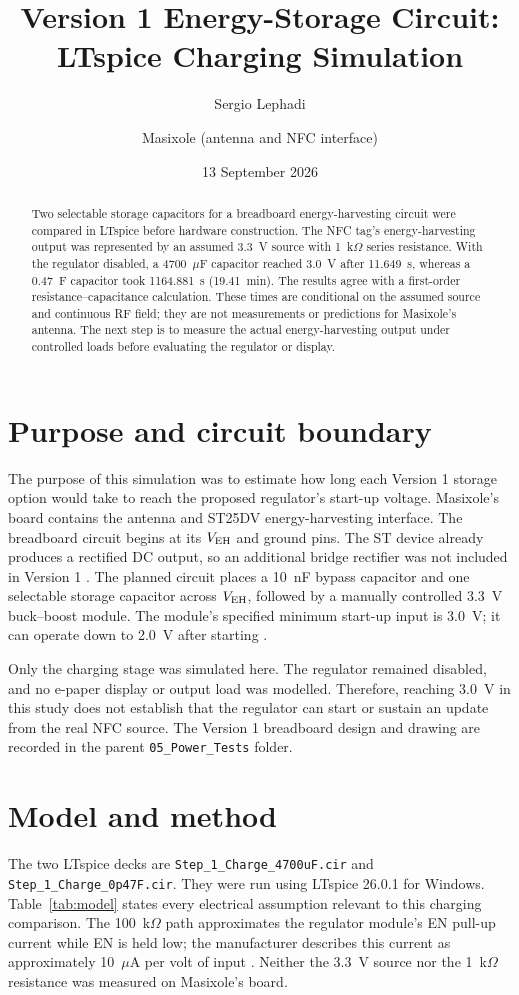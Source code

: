 \documentclass[11pt,a4paper]{article}
\title{Version 1 Energy-Storage Circuit: LTspice Charging Simulation}
\author{Sergio Lephadi \and Masixole (antenna and NFC interface)}
\date{13 September 2026}
\begin{document}
\maketitle

\begin{abstract}
Two selectable storage capacitors for a breadboard energy-harvesting circuit were compared in LTspice before hardware construction. The NFC tag's energy-harvesting output was represented by an assumed 3.3~V source with 1~k$\Omega$ series resistance. With the regulator disabled, a 4700~$\mu$F capacitor reached 3.0~V after 11.649~s, whereas a 0.47~F capacitor took 1164.881~s (19.41~min). The results agree with a first-order resistance--capacitance calculation. These times are conditional on the assumed source and continuous RF field; they are not measurements or predictions for Masixole's antenna. The next step is to measure the actual energy-harvesting output under controlled loads before evaluating the regulator or display.
\end{abstract}

\section{Purpose and circuit boundary}
The purpose of this simulation was to estimate how long each Version 1 storage option would take to reach the proposed regulator's start-up voltage. Masixole's board contains the antenna and ST25DV energy-harvesting interface. The breadboard circuit begins at its $V_{\rm EH}$ and ground pins. The ST device already produces a rectified DC output, so an additional bridge rectifier was not included in Version 1 \cite{st-an4913}. The planned circuit places a 10~nF bypass capacitor and one selectable storage capacitor across $V_{\rm EH}$, followed by a manually controlled 3.3~V buck--boost module. The module's specified minimum start-up input is 3.0~V; it can operate down to 2.0~V after starting \cite{pololu-5712}.

Only the charging stage was simulated here. The regulator remained disabled, and no e-paper display or output load was modelled. Therefore, reaching 3.0~V in this study does not establish that the regulator can start or sustain an update from the real NFC source. The Version 1 breadboard design and drawing are recorded in the parent \texttt{05\_Power\_Tests} folder.

\section{Model and method}
The two LTspice decks are \texttt{Step\_1\_Charge\_4700uF.cir} and \texttt{Step\_1\_Charge\_0p47F.cir}. They were run using LTspice 26.0.1 for Windows. Table~\ref{tab:model} states every electrical assumption relevant to this charging comparison. The 100~k$\Omega$ path approximates the regulator module's EN pull-up current while EN is held low; the manufacturer describes this current as approximately 10~$\mu$A per volt of input \cite{pololu-5712}. Neither the 3.3~V source nor the 1~k$\Omega$ resistance was measured on Masixole's board.
\end{document}
